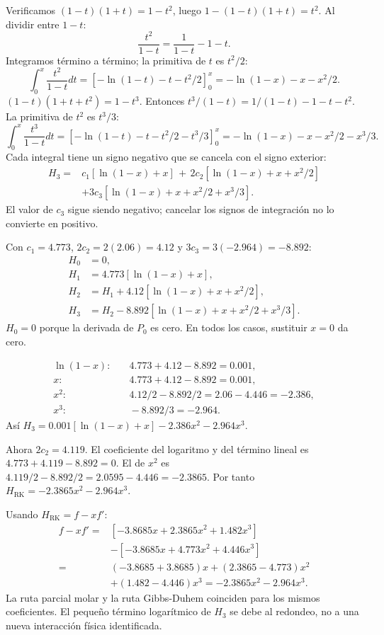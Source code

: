 Verificamos $(1-t)(1+t)=1-t^2$, luego $1-(1-t)(1+t)=t^2$. Al dividir entre $1-t$:
\[
\frac{t^2}{1-t}=\frac1{1-t}-1-t.
\]
Integramos término a término; la primitiva de $t$ es $t^2/2$:
\[
\int_0^x\frac{t^2}{1-t}dt=[-\ln(1-t)-t-t^2/2]_0^x
=-\ln(1-x)-x-x^2/2.
\]
$(1-t)(1+t+t^2)=1-t^3$. Entonces $t^3/(1-t)=1/(1-t)-1-t-t^2$. La primitiva de $t^2$ es $t^3/3$:
\[
\int_0^x\frac{t^3}{1-t}dt
=[-\ln(1-t)-t-t^2/2-t^3/3]_0^x
=-\ln(1-x)-x-x^2/2-x^3/3.
\]
Cada integral tiene un signo negativo que se cancela con el signo exterior:
\begin{align*}
H_3={}&c_1[\ln(1-x)+x]\,+\,2c_2[\ln(1-x)+x+x^2/2]\\
&+3c_3[\ln(1-x)+x+x^2/2+x^3/3].
\end{align*}
El valor de $c_3$ sigue siendo negativo; cancelar los signos de integración no lo convierte en positivo.

Con $c_1=4.773$, $2c_2=2(2.06)=4.12$ y $3c_3=3(-2.964)=-8.892$:
\begin{align*}
H_0&=0,\\
H_1&=4.773[\ln(1-x)+x],\\
H_2&=H_1+4.12[\ln(1-x)+x+x^2/2],\\
H_3&=H_2-8.892[\ln(1-x)+x+x^2/2+x^3/3].
\end{align*}
$H_0=0$ porque la derivada de $P_0$ es cero. En todos los casos, sustituir $x=0$ da cero.

\begin{align*}
\ln(1-x):&\quad4.773+4.12-8.892=0.001,\\
x:&\quad4.773+4.12-8.892=0.001,\\
x^2:&\quad4.12/2-8.892/2=2.06-4.446=-2.386,\\
x^3:&\quad-8.892/3=-2.964.
\end{align*}
Así $H_3=0.001[\ln(1-x)+x]-2.386x^2-2.964x^3$.

Ahora $2c_2=4.119$. El coeficiente del logaritmo y del término lineal es $4.773+4.119-8.892=0$. El de $x^2$ es $4.119/2-8.892/2=2.0595-4.446=-2.3865$. Por tanto $H_{\mathrm{RK}}=-2.3865x^2-2.964x^3$.

Usando $H_{\mathrm{RK}}=f-xf'$:
\begin{align*}
f-xf'={}&[-3.8685x+2.3865x^2+1.482x^3]\\
&-[-3.8685x+4.773x^2+4.446x^3]\\
={}&(-3.8685+3.8685)x+(2.3865-4.773)x^2\\
&+(1.482-4.446)x^3=-2.3865x^2-2.964x^3.
\end{align*}
La ruta parcial molar y la ruta Gibbs-Duhem coinciden para los mismos coeficientes. El pequeño término logarítmico de $H_3$ se debe al redondeo, no a una nueva interacción física identificada.

